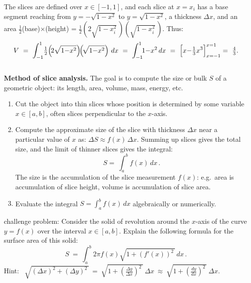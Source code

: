 \documentclass[11pt]{article}
\begin{document}
\noindent
The slices are defined over $x\in[-1,1]$, and each slice at $x=x_i$ has a base segment
reaching from $y=-\sqrt{1-x^2}$ to $y=\sqrt{1-x^2}$, a thickness $\Delta x$,
and an area $\frac12$(base)$\times$(height) = $\tfrac12\!\left(\!2\sqrt{1{-}x_i^2}\,\right)\!\!\left(\!\sqrt{1{-}x_i^2}\,\right)$.
Thus:
$$
V
\ =\ 
\int_{-1}^1\!\tfrac12\!\left(\!2\sqrt{1{-}x^2}\right)\!\!\left(\!\sqrt{1{-}x^2}\right)\,dx
\ =\ 
\int_{-1}^1\!\! 1{-}x^2\,dx
\ =\ 
\left[\vphantom{\sum}x {-} \tfrac13x^3\right]_{x=-1}^{x=1}
 =\ \tfrac43.
$$
\\[0em]
{\bf Method of slice analysis.} 
The goal is to compute the size or bulk $S$ of a geometric object: 
its length, area, volume, mass, energy, etc.
\begin{enumerate}
\item Cut the object into thin slices whose position is determined by
some variable $x\in[a,b]$, often slices perpendicular to the $x$-axis. 

\item Compute the approximate size of the slice with thickness $\Delta x$ 
near a particular value of $x$ as: $\Delta S \approx f(x)\,\Delta x$.
Summing up slices gives the total size, and the limit of thinner slices gives the integral:
$$
S  =\ \int_a^b\!\! f(x)\,dx\,.
$$
The size is the accumulation of the slice measurement $f(x)$: 
e.g.~area is accumulation of slice height, volume is accumulation of slice area.

\item Evaluate the integral $S=\int_a^b\!f(x)\,dx$ algebraically or numerically.

\end{enumerate}
\bigskip

\noindent
{\small
{\sc challenge problem:} Consider the solid of revolution around the $x$-axis of the curve $y=f(x)$
over the interval $x\in[a,b]$. Explain the following formula for the surface area of 
this solid: $$S \ =\ \int_a^b 2\pi f(x)\sqrt{1{+}(f'(x))^2\,}\, dx\,.$$
Hint: \
$\sqrt{(\Delta x)^2 + (\Delta y)^2\,} 
\ =\ \sqrt{1+(\frac{\Delta y}{\Delta x})^2\,}\ \Delta x 
\ \approx\ \sqrt{1+(\frac{dy}{dx})^2\, }\ \Delta x$.
}
\end{document}
